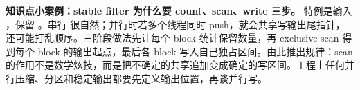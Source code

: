 \begin{casebox}
\textbf{知识点小案例：stable filter 为什么要 count、scan、write 三步。}
特例是输入 \code{[a,b,c,d]}，保留 。串行  很自然；并行时若多个线程同时 push，就会共享写输出尾指针，还可能打乱顺序。三阶段做法先让每个 block 统计保留数量，再 exclusive scan 得到每个 block 的输出起点，最后各 block 写入自己独占区间。由此推出规律：scan 的作用不是数学炫技，而是把不确定的共享追加变成确定的写区间。工程上任何并行压缩、分区和稳定输出都要先定义输出位置，再谈并行写。
\end{casebox}
